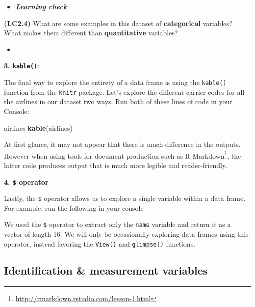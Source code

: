 \documentclass[12pt, krantz2,]{krantz}
\makeatletter
\newenvironment{Shaded}{\begin{snugshade}}{\end{snugshade}}
\newcommand{\KeywordTok}[1]{\textcolor[rgb]{0.27,0.27,0.27}{\textbf{#1}}}
\newcommand{\NormalTok}[1]{#1}
\newcommand{\OperatorTok}[1]{\textcolor[rgb]{0.43,0.43,0.43}{\textbf{#1}}}
\renewcommand{\href}[2]{#2\footnote{\url{#1}}}
\newenvironment{kframe}{%
\medskip{}
\setlength{\fboxsep}{.8em}
 \def\at@end@of@kframe{}%
 \ifinner\ifhmode%
  \def\at@end@of@kframe{\end{minipage}}%
  \begin{minipage}{\columnwidth}%
 \fi\fi%
 \def\FrameCommand##1{\hskip\@totalleftmargin \hskip-\fboxsep
 \colorbox{shadecolor}{##1}\hskip-\fboxsep
     \hskip-\linewidth \hskip-\@totalleftmargin \hskip\columnwidth}%
 \MakeFramed {\advance\hsize-\width
   \@totalleftmargin\z@ \linewidth\hsize
   \@setminipage}}%
 {\par\unskip\endMakeFramed%
 \at@end@of@kframe}
\renewenvironment{Shaded}{\begin{kframe}}{\end{kframe}}
\newenvironment{rmdblock}[1]
  {\begin{shaded*}
  \begin{itemize}
  \renewcommand{\labelitemi}{
    \raisebox{-.7\height}[0pt][0pt]{
    }
  }
  \item
  }
  {
  \end{itemize}
  \end{shaded*}
  }
\newenvironment{learncheck}
  {\begin{rmdblock}{warning}}
  {\end{rmdblock}}
\makeatother
\begin{document}
\begin{learncheck}
\textbf{\emph{Learning check}}
\end{learncheck}

\textbf{(LC2.4)} What are some examples in this dataset of \textbf{categorical} variables? What makes them different than \textbf{quantitative} variables?

\begin{learncheck}

\end{learncheck}

\textbf{3. \texttt{kable()}}:

The final way to explore the entirety of a data frame is using the \texttt{kable()} function from the \texttt{knitr} package. Let's explore the different carrier codes for all the airlines in our dataset two ways. Run both of these lines of code in your Console:

\begin{Shaded}
\begin{Highlighting}[]
\NormalTok{airlines}
\KeywordTok{kable}\NormalTok{(airlines)}
\end{Highlighting}
\end{Shaded}

At first glance, it may not appear that there is much difference in the outputs. However when using tools for document production such as \href{http://rmarkdown.rstudio.com/lesson-1.html}{R Markdown}, the latter code produces output that is much more legible and reader-friendly.

\textbf{4. \texttt{\$} operator}

Lastly, the \texttt{\$} operator allows us to explore a single variable within a data frame. For example, run the following in your console

\begin{Shaded}
\end{Shaded}

We used the \texttt{\$} operator to extract only the \texttt{name} variable and return it as a vector of length 16. We will only be occasionally exploring data frames using this operator, instead favoring the \texttt{View()} and \texttt{glimpse()} functions.

\hypertarget{identification-vs-measurement-variables}{%
\subsection{Identification \& measurement variables}\label{identification-vs-measurement-variables}}
\end{document}
